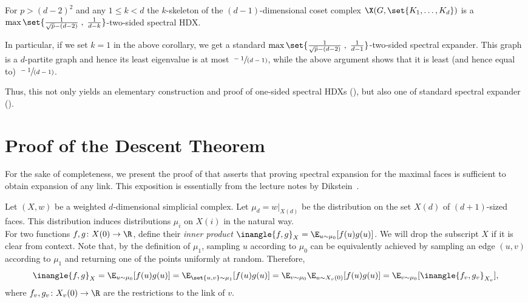 \documentclass{toc}
\begin{document}
\begin{corollary}\label{cor:KO-exp} For $p > (d-2)^2$ and any $1 \leq
  k < d$
  the $k$-skeleton of the $(d-1)$-dimensional coset complex $\X(G,\set{K_1,\ldots,K_d})$
is a $\max\set{\frac1{\sqrt{p}-(d-2)}\;,\;\frac{1}{d-k}}$-two-sided spectral HDX.
  \end{corollary}

  In particular, if we set $k=1$ in the above corollary, we get a
  standard
  $\max\set{\frac1{\sqrt{p}-(d-2)}\;,\;\frac{1}{d-1}}$-two-sided spectral expander.  This graph is a $d$-partite graph and hence its
  least eigenvalue is at most $\sfrac{-1}{(d-1)}$, while the above
  argument shows that it is least (and hence equal to)
  $\sfrac{-1}{(d-1)}$. 

 Thus, this not only yields an elementary construction and proof of
  one-sided spectral HDXs (), but also one of
  standard spectral expander ().
  
  


\appendix

\section{Proof of the Descent Theorem}\label{sec:descent}

For the sake of completeness, we present the proof of
 that asserts that proving spectral expansion
for the maximal faces is sufficient to obtain expansion of any
link. This exposition is essentially from the lecture notes by 
Dikstein~\cite{Dikstein2019}. 

Let $(X,w)$ be a weighted $d$-dimensional simplicial complex. Let
$\mu_{d}=w|_{X(d)}$ be the distribution on the set $X(d)$ of
$(d+1)$-sized faces. This distribution induces distributions $\mu_i$ on
$X(i)$ in the natural way.\\ 

For two functions $f,g\colon X(0) \rightarrow \R$, define their \emph{inner product}
$\inangle{f,g}_X = \E_{u \sim \mu_0} [f(u) g(u)]$. We will drop the
subscript $X$ if it is clear from context. Note that, by the
definition of $\mu_1$, sampling $u$ according to $\mu_0$  can be
equivalently achieved  by sampling an edge $(u,v)$ according to $\mu_1$ and returning one of the points uniformly at random. Therefore,
\begin{equation}\label{eqn-innerprod1}
  \inangle{f,g}_X = \E_{u \sim \mu_0}[f(u) g(u)] = \E_{\set{u,v} \sim
    \mu_1}[f(u)g(u)] =\E_{v \sim \mu_0} \E_{u \sim X_v(0)}[f(u) g(u)] =\E_{v \sim \mu_0}[\inangle{f_v,g_v}_{X_v}],
\end{equation}
where $f_v,g_v\colon X_v(0) \rightarrow \R$ are the restrictions to the link of $v$. 
\end{document}
